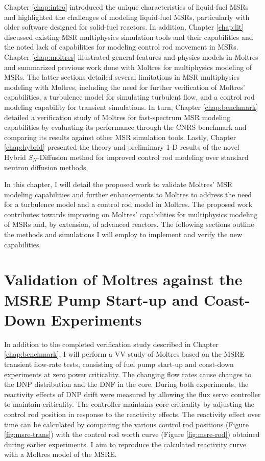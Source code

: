Chapter \ref{chap:intro} introduced the unique characteristics of liquid-fuel
\glspl{MSR}
and highlighted the challenges of modeling liquid-fuel \glspl{MSR}, particularly
with older software designed for solid-fuel reactors. In addition, Chapter
\ref{chap:lit} discussed existing \gls{MSR} multiphysics simulation tools and
their capabilities and the noted lack of capabilities for modeling control rod
movement in \glspl{MSR}. Chapter \ref{chap:moltres} illustrated general
features and physics models in Moltres and summarized previous work done with
Moltres for multiphysics modeling of \glspl{MSR}. The latter sections detailed
several limitations in \gls{MSR} multiphysics modeling with
Moltres, including the need for further verification of
Moltres' capabilities, a turbulence model for simulating turbulent flow, and a
control rod modeling capability for transient simulations. In turn,
Chapter \ref{chap:benchmark} detailed a verification study of Moltres for fast-spectrum
\gls{MSR} modeling capabilities by evaluating its performance
through the CNRS benchmark and comparing its results against other
\gls{MSR} simulation tools. Lastly, Chapter \ref{chap:hybrid} presented the theory and preliminary
1-D results of the novel Hybrid $S_N$-Diffusion method for improved control rod modeling over
standard neutron diffusion methods.

In this chapter, I will detail the proposed work to validate Moltres' \gls{MSR}
modeling capabilities and further enhancements to Moltres to address the
need for a turbulence model and a control rod model in Moltres. The
proposed work contributes towards improving on Moltres' capabilities for
multiphysics modeling of \glspl{MSR} and, by extension, of advanced reactors.
The following sections outline the methods and simulations I will
employ to implement and verify the new capabilities.

\section{Validation of Moltres against the MSRE Pump Start-up and Coast-Down Experiments}

In addition to the completed verification study described in Chapter \ref{chap:benchmark}, I will
perform a \gls{VV} study of Moltres based on the \gls{MSRE} transient flow-rate tests, consisting
of fuel pump start-up and coast-down experiments at zero power criticality. The changing flow rates
cause changes to the \gls{DNP} distribution and the \gls{DNF} in the core. During both
experiments, the reactivity effects of \gls{DNP} drift were measured by
allowing the flux servo controller to maintain criticality. The controller maintains core
criticality by adjusting the control rod position in response to the reactivity effects. The
reactivity effect over time can be calculated by comparing the various control rod positions
(Figure \ref{fig:msre-trans}) with the control rod worth curve (Figure \ref{fig:msre-rod})
obtained during earlier experiments. I aim to
reproduce the calculated reactivity curve with a Moltres model of the \gls{MSRE}.

